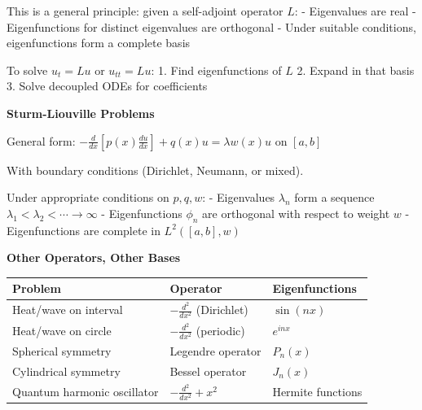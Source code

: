 \documentclass[
  10pt,
  letterpaper,
]{scrbook}
\begin{document}
This is a general principle: given a self-adjoint operator \(L\): -
Eigenvalues are real - Eigenfunctions for distinct eigenvalues are
orthogonal - Under suitable conditions, eigenfunctions form a complete
basis

To solve \(u_t = Lu\) or \(u_{tt} = Lu\): 1. Find eigenfunctions of
\(L\) 2. Expand in that basis 3. Solve decoupled ODEs for coefficients

\textbf{Sturm-Liouville Problems}

General form:
\(-\frac{d}{dx}\left[p(x)\frac{du}{dx}\right] + q(x)u = \lambda w(x)u\)
on \([a, b]\)

With boundary conditions (Dirichlet, Neumann, or mixed).

Under appropriate conditions on \(p, q, w\): - Eigenvalues \(\lambda_n\)
form a sequence \(\lambda_1 < \lambda_2 < \cdots \to \infty\) -
Eigenfunctions \(\phi_n\) are orthogonal with respect to weight \(w\) -
Eigenfunctions are complete in \(L^2([a, b], w)\)

\textbf{Other Operators, Other Bases}

\begin{longtable}[]{@{}
  >{\raggedright\arraybackslash}p{}
  >{\raggedright\arraybackslash}p{}
  >{\raggedright\arraybackslash}p{}@{}}
\toprule\noalign{}
\begin{minipage}[b]{\linewidth}\raggedright
Problem
\end{minipage} & \begin{minipage}[b]{\linewidth}\raggedright
Operator
\end{minipage} & \begin{minipage}[b]{\linewidth}\raggedright
Eigenfunctions
\end{minipage} \\
\midrule\noalign{}
\endhead
\bottomrule\noalign{}
\endlastfoot
Heat/wave on interval & \(-\frac{d^2}{dx^2}\) (Dirichlet) &
\(\sin(nx)\) \\
Heat/wave on circle & \(-\frac{d^2}{dx^2}\) (periodic) & \(e^{inx}\) \\
Spherical symmetry & Legendre operator & \(P_n(x)\) \\
Cylindrical symmetry & Bessel operator & \(J_n(x)\) \\
Quantum harmonic oscillator & \(-\frac{d^2}{dx^2} + x^2\) & Hermite
functions \\
\end{longtable}
\end{document}
